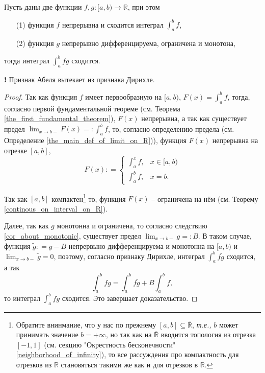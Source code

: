 \begin{theorem}
    Пусть даны две функции $f,g:[a,b) \to \mathbb{R}$, при этом
    \begin{itemize}
        \item[(1)] функция $f$ непрерывна и сходится интеграл $\int_a^b f$,
        \item[(2)] функция $g$ непрерывно дифференцируема, ограничена и монотона,
    \end{itemize}
    тогда интеграл $\int_a^b fg$ сходится.
\end{theorem}

\begin{mydanger}{\bf!}
    Признак Абеля вытекает из признака Дирихле.
\end{mydanger}

\begin{proof}
    Так как функция $f$ имеет первообразную на $[a,b)$, $F(x) = \int_a^b f$, тогда, согласно первой фундаментальной теореме (см. Теорема \ref{the_first_fundamental_theorem}), $F(x)$ непрерывна, а так как существует предел $\lim_{x \to b-}F(x)=:\int_a^b f$, то, согласно определению предела (см. Определение \ref{the_main_def_of_limit_on_R})), функция $F(x)$ непрерывна на отрезке $[a,b]$,
    \[
     F(x) : = \begin{cases}
         \int_a^xf, & x\in [a,b)\\
         \int_a^b f, & x = b.
     \end{cases}
     \]

     Так как $[a,b]$ компактен\footnote{Обратите внинмание, что у нас по прежнему $[a,b] \subseteq \overline{\mathbb{R}}$, \textit{т.е.,} $b$ может принимать значение $b = + \infty$, но так как на $\overline{\mathbb{R}}$ вводится топология из отрезка $[-1,1]$ (см. секцию "Окрестность бесконечности" \ref{neighborhood_of_infinity}), то все рассуждения про компактность для отрезков из $\mathbb{R}$ становяться такими же как и для отрезков в $\overline{\mathbb{R}}$.} то, функция $F(x)$ -- ограничена на нём (см. Теорему \ref{continous_on_interval_on_R}).

     Далее, так как $g$ монотонна и ограничена, то согласно следствию \ref{cor_about_monotonic}, существует предел $\lim_{x \to b-} g=: B$. В таком случае, функция $\widetilde{g}: = g - B$ непрервыно дифференцируема и монотонна на $[a,b)$ и $\lim_{x \to b-}\widetilde{g}=0 $, поэтому, согласно признаку Дирихле, интеграл $\int_a^b f\widetilde{g}$ сходится, а так
     \[
      \int_a^b fg = \int_a^b f\widetilde{g} + B\int_a^bf, 
     \]
     то интеграл $\int_a^b fg$ сходится. Это завершает доказательство.
\end{proof}